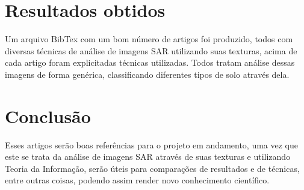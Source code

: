 \documentclass[12pt]{article}
\begin{document}
\section{Resultados obtidos}

Um arquivo BibTex com um bom número de artigos foi produzido, todos com diversas técnicas de análise de imagens SAR utilizando suas texturas, acima de cada artigo foram explicitadas técnicas utilizadas. Todos tratam análise dessas imagens de forma genérica, classificando diferentes tipos de solo através dela.

\section{Conclusão}

Esses artigos serão boas referências para o projeto em andamento, uma vez que este se trata da análise de imagens SAR através de suas texturas e utilizando Teoria da Informação, serão úteis para comparações de resultados e de técnicas, entre outras coisas, podendo assim render novo conhecimento científico.
\end{document}
